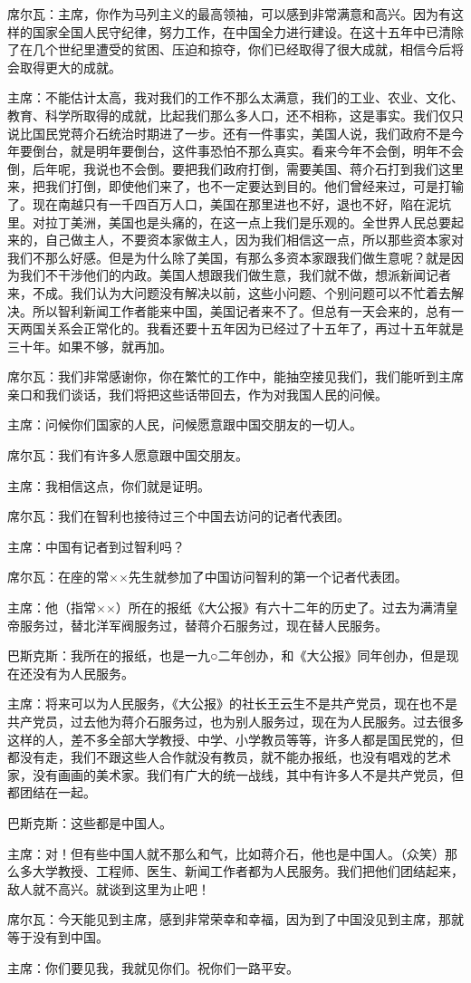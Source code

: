 席尔瓦：主席，你作为马列主义的最高领袖，可以感到非常满意和高兴。因为有这样的国家全国人民守纪律，努力工作，在中国全力进行建设。在这十五年中已清除了在几个世纪里遭受的贫困、压迫和掠夺，你们已经取得了很大成就，相信今后将会取得更大的成就。

主席：不能估计太高，我对我们的工作不那么太满意，我们的工业、农业、文化、教育、科学所取得的成就，比起我们那么多人口，还不相称，这是事实。我们仅只说比国民党蒋介石统治时期进了一步。还有一件事实，美国人说，我们政府不是今年要倒台，就是明年要倒台，这件事恐怕不那么真实。看来今年不会倒，明年不会倒，后年呢，我说也不会倒。要把我们政府打倒，需要美国、蒋介石打到我们这里来，把我们打倒，即使他们来了，也不一定要达到目的。他们曾经来过，可是打输了。现在南越只有一千四百万人口，美国在那里进也不好，退也不好，陷在泥坑里。对拉丁美洲，美国也是头痛的，在这一点上我们是乐观的。全世界人民总要起来的，自己做主人，不要资本家做主人，因为我们相信这一点，所以那些资本家对我们不那么好感。但是为什么除了美国，有那么多资本家跟我们做生意呢？就是因为我们不干涉他们的内政。美国人想跟我们做生意，我们就不做，想派新闻记者来，不成。我们认为大问题没有解决以前，这些小问题、个别问题可以不忙着去解决。所以智利新闻工作者能来中国，美国记者来不了。但总有一天会来的，总有一天两国关系会正常化的。我看还要十五年因为已经过了十五年了，再过十五年就是三十年。如果不够，就再加。

席尔瓦：我们非常感谢你，你在繁忙的工作中，能抽空接见我们，我们能听到主席亲口和我们谈话，我们将把这些话带回去，作为对我国人民的问候。

主席：问候你们国家的人民，问候愿意跟中国交朋友的一切人。

席尔瓦：我们有许多人愿意跟中国交朋友。

主席：我相信这点，你们就是证明。

席尔瓦：我们在智利也接待过三个中国去访问的记者代表团。

主席：中国有记者到过智利吗？

席尔瓦：在座的常××先生就参加了中国访问智利的第一个记者代表团。

主席：他（指常××）所在的报纸《大公报》有六十二年的历史了。过去为满清皇帝服务过，替北洋军阀服务过，替蒋介石服务过，现在替人民服务。

巴斯克斯：我所在的报纸，也是一九○二年创办，和《大公报》同年创办，但是现在还没有为人民服务。

主席：将来可以为人民服务，《大公报》的社长王云生不是共产党员，现在也不是共产党员，过去他为蒋介石服务过，也为别人服务过，现在为人民服务。过去很多这样的人，差不多全部大学教授、中学、小学教员等等，许多人都是国民党的，但都没有走，我们不跟这些人合作就没有教员，就不能办报纸，也没有唱戏的艺术家，没有画画的美术家。我们有广大的统一战线，其中有许多人不是共产党员，但都团结在一起。

巴斯克斯：这些都是中国人。

主席：对！但有些中国人就不那么和气，比如蒋介石，他也是中国人。（众笑）那么多大学教授、工程师、医生、新闻工作者都为人民服务。我们把他们团结起来，敌人就不高兴。就谈到这里为止吧！

席尔瓦：今天能见到主席，感到非常荣幸和幸福，因为到了中国没见到主席，那就等于没有到中国。

主席：你们要见我，我就见你们。祝你们一路平安。


